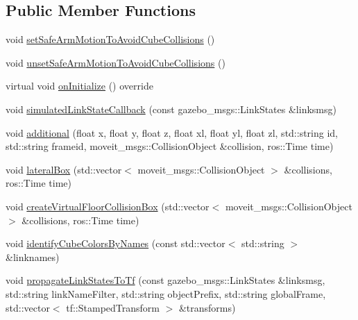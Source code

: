 \subsection*{Public Member Functions}
\begin{DoxyCompactItemize}
\item 
void \hyperlink{classsm__moveit__4_1_1cl__perception__system_1_1CpSimulatedGazeboPerception_af42b5a4e239fcac98a222c34115c9bc0}{set\+Safe\+Arm\+Motion\+To\+Avoid\+Cube\+Collisions} ()
\item 
void \hyperlink{classsm__moveit__4_1_1cl__perception__system_1_1CpSimulatedGazeboPerception_a7f5d68f2ff7dd0ade9756058e790efa1}{unset\+Safe\+Arm\+Motion\+To\+Avoid\+Cube\+Collisions} ()
\item 
virtual void \hyperlink{classsm__moveit__4_1_1cl__perception__system_1_1CpSimulatedGazeboPerception_adebc30f6b1fc905f783de3f7bdf4a711}{on\+Initialize} () override
\item 
void \hyperlink{classsm__moveit__4_1_1cl__perception__system_1_1CpSimulatedGazeboPerception_a7914ffd20518c866a8a1e11254589d12}{simulated\+Link\+State\+Callback} (const gazebo\+\_\+msgs\+::\+Link\+States \&linksmsg)
\item 
void \hyperlink{classsm__moveit__4_1_1cl__perception__system_1_1CpSimulatedGazeboPerception_a23c97387cc84b87183a39489438aeaf0}{additional} (float x, float y, float z, float xl, float yl, float zl, std\+::string id, std\+::string frameid, moveit\+\_\+msgs\+::\+Collision\+Object \&collision, ros\+::\+Time time)
\item 
void \hyperlink{classsm__moveit__4_1_1cl__perception__system_1_1CpSimulatedGazeboPerception_adf4810736ecdd01ba42fc86ea337e5e1}{lateral\+Box} (std\+::vector$<$ moveit\+\_\+msgs\+::\+Collision\+Object $>$ \&collisions, ros\+::\+Time time)
\item 
void \hyperlink{classsm__moveit__4_1_1cl__perception__system_1_1CpSimulatedGazeboPerception_a668b93281f2ab325c790e20f452f3f8f}{create\+Virtual\+Floor\+Collision\+Box} (std\+::vector$<$ moveit\+\_\+msgs\+::\+Collision\+Object $>$ \&collisions, ros\+::\+Time time)
\item 
void \hyperlink{classsm__moveit__4_1_1cl__perception__system_1_1CpSimulatedGazeboPerception_aac02fd742b0074f62d8909ce00a02d3b}{identify\+Cube\+Colors\+By\+Names} (const std\+::vector$<$ std\+::string $>$ \&linknames)
\item 
void \hyperlink{classsm__moveit__4_1_1cl__perception__system_1_1CpSimulatedGazeboPerception_a643fa78620216085ca385b74832a0abc}{propagate\+Link\+States\+To\+Tf} (const gazebo\+\_\+msgs\+::\+Link\+States \&linksmsg, std\+::string link\+Name\+Filter, std\+::string object\+Prefix, std\+::string global\+Frame, std\+::vector$<$ tf\+::\+Stamped\+Transform $>$ \&transforms)
\end{DoxyCompactItemize}
